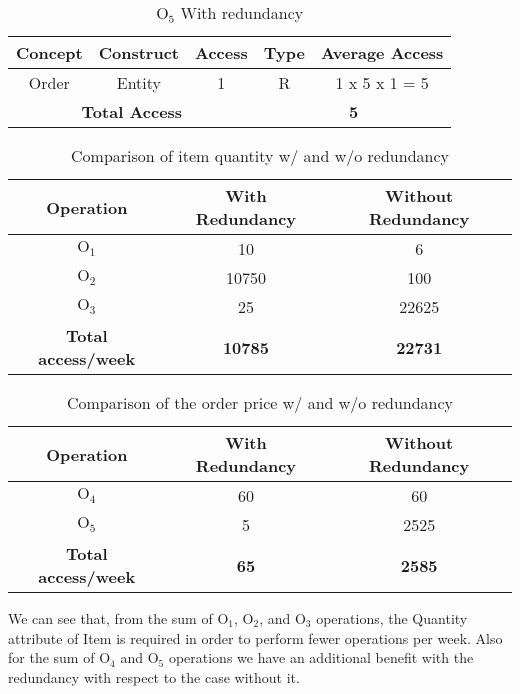 \begin{table}[!h]\caption{	$ \textrm{O}_\textrm{5} $ With redundancy }
	\begin{center}
		\begin{tabular}{| c | c | c | c | c |}
			\hline
			\textbf{Concept} & \textbf{Construct} & \textbf{Access} & \textbf{Type} & \textbf{Average Access} \\ \hline
			Order & Entity & 1 & R & 1 x 5 x 1 = 5 \\ \hline
			\multicolumn{3}{|c|}{\textbf{Total Access}} & \multicolumn{2}{|c|}{\textbf{5}} \\ \hline
		\end{tabular}
	\end{center}
\end{table}
\begin{table}[!h]\caption{ Comparison of item quantity w/ and w/o redundancy }
	\begin{center}
		\begin{tabular}{ | c | c | c | }
			\hline
			\textbf{Operation} & \textbf{With Redundancy} & \textbf{Without Redundancy} \\ \hline
			$ \textrm{O}_\textrm{1} $ & 10 & 6\\ \hline
			$ \textrm{O}_\textrm{2} $ & 10750 & 100 \\ \hline
			$ \textrm{O}_\textrm{3} $ & 25 & 22625 \\\hline
			\textbf{Total access/week } & 	\textbf{10785} &	\textbf{22731} \\\hline
		\end{tabular}
	\end{center}
\end{table}
\begin{table}[!h]\caption{ Comparison of the order price w/ and w/o redundancy }
	\begin{center}
		\begin{tabular}{ | c | c | c | }
			\hline
			\textbf{Operation} & \textbf{With Redundancy} & \textbf{Without Redundancy} \\ \hline
			$ \textrm{O}_\textrm{4} $ & 60 & 60\\ \hline
			$ \textrm{O}_\textrm{5} $ & 5 & 2525 \\ \hline
			\textbf{Total access/week } & 	\textbf{65} &	\textbf{2585} \\\hline
		\end{tabular}
	\end{center}
\end{table}
\newpage
We can see that, from the sum of $ \textrm{O}_\textrm{1}$, $ \textrm{O}_\textrm{2}$, and $ \textrm{O}_\textrm{3}$ operations, the Quantity attribute of Item is required in order to perform fewer operations per week. Also for the sum of $ \textrm{O}_\textrm{4}$ and $ \textrm{O}_\textrm{5}$ operations we have an additional benefit with the redundancy with respect to the case without it.